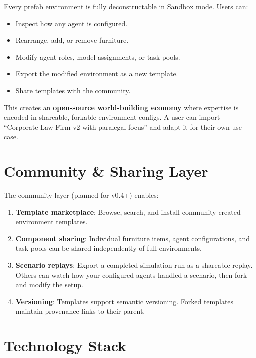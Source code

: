\documentclass[11pt,letterpaper]{article}
\begin{document}
Every prefab environment is fully deconstructable in Sandbox mode. Users can:

\begin{itemize}[leftmargin=2em]
  \item Inspect how any agent is configured.
  \item Rearrange, add, or remove furniture.
  \item Modify agent roles, model assignments, or task pools.
  \item Export the modified environment as a new template.
  \item Share templates with the community.
\end{itemize}

This creates an \textbf{open-source world-building economy} where expertise is encoded in shareable, forkable environment configs. A user can import ``Corporate Law Firm v2 with paralegal focus'' and adapt it for their own use case.


\section{Community \& Sharing Layer}

The community layer (planned for v0.4+) enables:

\begin{enumerate}[leftmargin=2em]
  \item \textbf{Template marketplace}: Browse, search, and install community-created environment templates.
  \item \textbf{Component sharing}: Individual furniture items, agent configurations, and task pools can be shared independently of full environments.
  \item \textbf{Scenario replays}: Export a completed simulation run as a shareable replay. Others can watch how your configured agents handled a scenario, then fork and modify the setup.
  \item \textbf{Versioning}: Templates support semantic versioning. Forked templates maintain provenance links to their parent.
\end{enumerate}


\section{Technology Stack}
\end{document}
